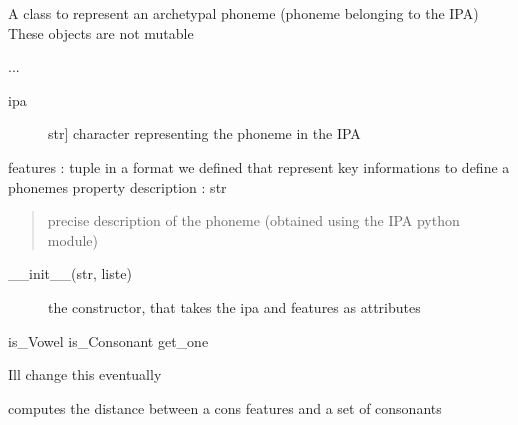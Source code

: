 \documentclass[letterpaper,10pt,english]{sphinxmanual}
\begin{document}
\begin{fulllineitems}
\label{\detokenize{index:IPA.archetype}}
\sphinxAtStartPar
A class to represent an archetypal phoneme (phoneme belonging to the IPA)
These objects are not mutable

\sphinxAtStartPar
...
\begin{description}
\item[{ipa}] \leavevmode{[}str{]}
\sphinxAtStartPar
character representing the phoneme in the IPA

\end{description}

\sphinxAtStartPar
features : tuple in a format we defined that represent key informations to define a phoneme\textquotesingle{}s property\textquotesingle{}
description : str
\begin{quote}

\sphinxAtStartPar
precise description of the phoneme (obtained using the IPA python module)
\end{quote}
\begin{description}
\item[{\_\_init\_\_(str, liste) }] \leavevmode
\sphinxAtStartPar
the constructor, that takes the ipa and features as attributes

\end{description}

\sphinxAtStartPar
is\_Vowel
is\_Consonant
get\_one

\begin{fulllineitems}
\label{\detokenize{index:IPA.archetype.get_one}}
\sphinxAtStartPar
I\textquotesingle{}ll change this eventually

\end{fulllineitems}


\end{fulllineitems}


\begin{fulllineitems}
\label{\detokenize{index:IPA.cons_dist}}
\sphinxAtStartPar
computes the distance between a cons features and a set of consonants

\end{fulllineitems}
\end{document}
